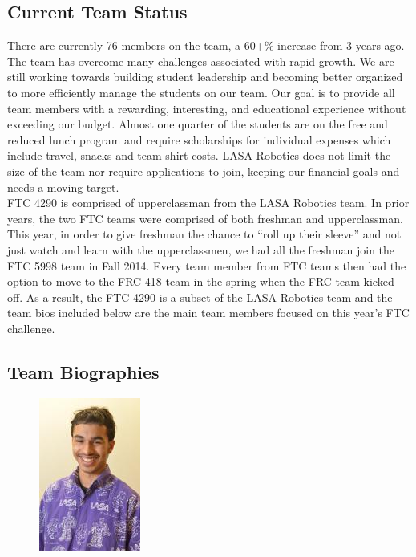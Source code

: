\clearpage
\newpage

\subsection{Current Team Status}
There are currently 76 members on the team, a 60+\% increase from 3 years ago. The team has overcome many challenges associated with rapid growth.  We are still working towards building student leadership and becoming better organized to more efficiently manage the students on our team.  Our goal is to provide all team members with a rewarding, interesting, and educational experience without exceeding our budget. Almost one quarter of the students are on the free and reduced lunch program and require scholarships for individual expenses which include travel, snacks and team shirt costs. LASA Robotics does not limit the size of the team nor require applications to join, keeping our financial goals and needs a moving target.\\

FTC 4290 is comprised of upperclassman from the LASA Robotics team.  In prior years, the two FTC teams were comprised of both freshman and upperclassman.  This year, in order to give freshman the chance to “roll up their sleeve” and not just watch and learn with the upperclassmen, we had all the freshman join the FTC 5998 team in Fall 2014.  Every team member from FTC teams then had the option to move to the FRC 418 team in the spring when the FRC team kicked off.  As a result, the FTC 4290 is a subset of the LASA Robotics team and the team bios included below are the main team members focused on this year’s FTC challenge.\\

\clearpage
\newpage

\subsection{Team Biographies}
\begin{figure}[H]
	\includegraphics[width=0.4\linewidth]{ehsan}
\end{figure}
